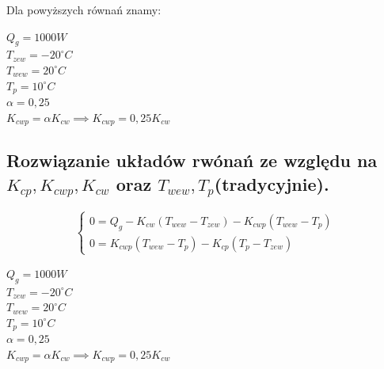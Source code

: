 \documentclass{article}
\begin{document}
Dla powyższych równań znamy:
\begin{flushleft}
    $Q_{g}=1000W$ \\
    $T_{zew}=-20^{\circ}C$\\
    $T_{wew}=20^{\circ}C$\\
    $T_{p}=10^{\circ}C$\\
    $\alpha=0,25$\\
    $K_{cwp}=\alpha K_{cw} \implies K_{cwp}=0,25K_{cw}$\\
\end{flushleft}


\newpage
\begin{flushleft}
\section{Rozwiązanie układów rwónań ze względu na $K_{cp}, K_{cwp}, K_{cw}$ oraz $T_{wew}, T_{p}$(tradycyjnie).}

\end{flushleft}
$$
 \begin{cases}
        0=Q_{g} -K_{cw} (T_{wew} - T_{zew})-K_{cwp} (T_{wew} -T_{p})\\
        0=K_{cwp}(T_{wew}-T_{p})-K_{cp}(T_{p}-T_{zew})
\end{cases}
$$

\begin{center}
     $Q_{g}=1000W$ \\
    $T_{zew}=-20^{\circ}C$\\
    $T_{wew}=20^{\circ}C$\\
    $T_{p}=10^{\circ}C$\\
    $\alpha=0,25$\\
    $K_{cwp}=\alpha K_{cw} \implies K_{cwp}=0,25K_{cw}$\\
\end{center}
\end{document}
